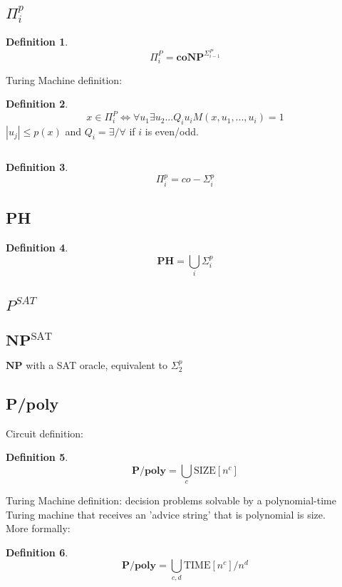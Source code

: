 \documentclass[]{article}
\theoremstyle{definition}
\newtheorem{definition}{Definition}[section]
\begin{document}
\subsection{$\Pi^p_i$}
\label{sec:pipi}
\begin{definition}
	$$\Pi_i^P = \hyperref[sec:coNP]{\textbf{coNP}}^{\hyperref[sec:sigmapi]{\Sigma_{i-1}^P}}$$
\end{definition}
$ $
\\
Turing Machine definition:
\begin{definition}
	$$x \in \Pi_i^P\iff \forall u_1\exists u_2 ... Q_i u_i M(x,u_1,...,u_i) = 1$$
	$|u_j| \leq p(x)$ and $Q_i=\exists/\forall$ if $i$ is even/odd.
\end{definition}
$ $
\\
\begin{definition}
	$$\Pi_i^p ={\hyperref[sec:sigmapi]{co-\Sigma_{i}^p}}$$
\end{definition}
\subsection{PH}
\label{sec:PH}
\begin{definition}
	$$\textbf{PH} =\bigcup_i\hyperref[sec:sigmapi]{\Sigma_{i}^p}$$
\end{definition}

\subsection{$P^{SAT}$}

\subsection{$\textbf{NP}^{\text{SAT}}$}
\label{sec:npsat}
$\textbf{NP}$ with a SAT oracle, equivalent to $\hyperref[sec:sigmap2]{\Sigma_2^p}$
\subsection{P/poly}
\label{sec:ppoly}
Circuit definition:
\begin{definition}
	$$\textbf{P/poly} = \bigcup_c \hyperref[sec:size]{\text{SIZE}[n^c]}$$
\end{definition}
$ $
\\
Turing Machine definition: decision problems solvable by a polynomial-time Turing machine that receives an 'advice string' that is polynomial is size.
\\
More formally:
\begin{definition}
		$$\textbf{P/poly} = \bigcup_{c,d} \hyperref[sec:time]{\text{TIME}[n^c]}/n^d$$
\end{definition}
\end{document}
